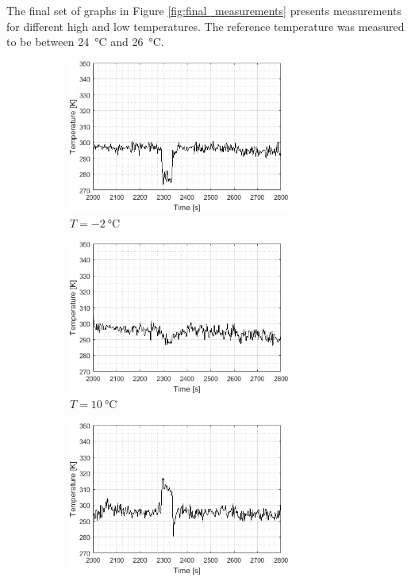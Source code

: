 \documentclass{standalone}
\begin{document}
The final set of graphs in Figure \ref{fig:final_measurements} presents measurements for different high and low temperatures. The reference temperature was measured to be between \SI{24}{\celsius} and \SI{26}{\celsius}.
\begin{landscape}
	\begin{figure}[h]
		\centering
		\begin{subfigure}[b]{0.49\linewidth}
			\centering
			\includegraphics[width=0.8\textwidth]{appendix/final_measurements_-2c.png}
			\caption{$T = \SI{-2}{\celsius}$}
			\vspace{1em}
		\end{subfigure}
		\begin{subfigure}[b]{0.49\linewidth}
			\centering
			\includegraphics[width=0.8\textwidth]{appendix/final_measurements_10c.png}
			\caption{$T = \SI{10}{\celsius}$}
			\vspace{1em}
		\end{subfigure}
		\begin{subfigure}[b]{0.49\linewidth}
			\centering
			\includegraphics[width=0.8\textwidth]{appendix/final_measurements_40c.png}

\end{subfigure}
\end{figure}
\end{landscape}
\end{document}
